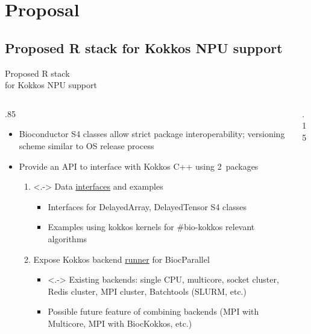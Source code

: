 \documentclass[
aspectratio=169,
xcolor={usenames}
]{beamer}
\begin{document}
\section{Proposal}

\subsection{Proposed R stack for Kokkos NPU support}
\begin{frame}{\hspace{8cm}Proposed R stack\\%
    \hspace{8cm}for Kokkos NPU support}
  \begin{columns}[T]
    \begin{column}{.85\framewidth}
      \begin{itemize}[<+->]
      \item Bioconductor S4 classes %
        allow strict package interoperability; %
        versioning scheme similar to OS release process
      \item Provide an API to interface with Kokkos C++ using 2~packages
        \begin{enumerate}
        \item<.-> Data \ul{interfaces} and examples
          \begin{itemize}[<.->]
          \item Interfaces for DelayedArray, DelayedTensor S4 classes
          \item Examples using kokkos kernels %
            for \#bio-kokkos relevant algorithms
          \end{itemize}
        \item Expose Kokkos backend \ul{runner} for BiocParallel
          \begin{itemize}
          \item<.-> Existing backends: %
            single CPU, %
            multicore, %
            socket cluster, %
            Redis cluster, %
            MPI cluster, %
            Batchtools (SLURM, etc.)
          \item Possible future feature of combining backends %
            (MPI with Multicore, MPI with BiocKokkos, etc.)
          \end{itemize}
        \end{enumerate}
      \end{itemize}
    \end{column}
    \begin{column}{.15\framewidth}

\end{column}
\end{columns}
\end{frame}
\end{document}
